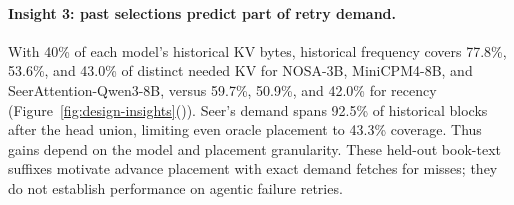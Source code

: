 \paragraph{Insight 3: past selections predict part of retry demand.}
With 40\% of each model's historical KV bytes, historical frequency
covers 77.8\%, 53.6\%, and 43.0\% of distinct needed KV for NOSA-3B,
MiniCPM4-8B, and SeerAttention-Qwen3-8B, versus 59.7\%, 50.9\%, and
42.0\% for recency
(Figure~\ref{fig:design-insights}()).
Seer's demand spans 92.5\% of historical blocks after the head union,
limiting even oracle placement to 43.3\% coverage. Thus gains depend on
the model and placement granularity. These held-out book-text suffixes
motivate advance placement with exact demand fetches for misses;
they do not establish performance on agentic failure retries.
